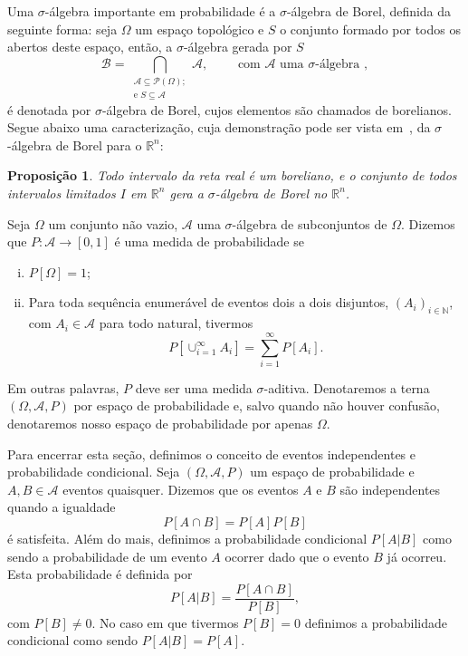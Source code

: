 \documentclass[twoside,openright,titlepage,numbers=noenddot,headinclude,  lineheaders footinclude=true,cleardoublepage=empty,
                                BCOR=5mm,paper=a4,fontsize=12pt ]{scrbook}
\newtheorem{prop}[teo]{Proposição}
\theoremstyle{definition}
\begin{document}
Uma $\sigma$-álgebra importante em probabilidade é a $\sigma$-álgebra de Borel, definida
da seguinte forma: seja $\Omega$ um espaço topológico e $S$ o conjunto formado
por todos os abertos deste espaço, então, a $\sigma$-álgebra  gerada por $S$
\[
\mathscr{B} = \bigcap_{ \substack{ \mathscr{A} \subseteq \mathscr{P}(\Omega);\\  
\text{e }S \subseteq \mathscr{A} } } \mathscr{A}, \qquad \text{ com } \mathscr{A} \text{ uma $\sigma$-álgebra },
\]
é denotada
por $\sigma$-álgebra de Borel, cujos elementos são chamados de borelianos. Segue abaixo uma caracterização,
cuja demonstração pode ser vista em~\cite{isnard},
da $\sigma$-álgebra de Borel para o $\mathbb{R}^n$:
\begin{prop}
Todo intervalo da reta real é um boreliano, e o conjunto de todos intervalos limitados $I$ em $\mathbb{R}^n$
gera a $\sigma$-álgebra de Borel no $\mathbb{R}^n$.
\end{prop}

Seja $\Omega$ um conjunto não vazio, $\mathscr{A}$ uma $\sigma$-álgebra de subconjuntos de $\Omega$.
Dizemos que $P: \mathscr{A} \rightarrow [0,1]$ é uma medida de probabilidade se
\begin{enumerate}[(i)]
\item $P[\Omega] = 1$;
\item Para toda sequência enumerável de eventos dois a dois disjuntos, $(A_i)_{i \in \mathbb{N}}$, com $A_i \in \mathscr{A}$ para todo 
natural, tivermos
\[
P[ \cup_{i = 1}^{\infty} A_i ] = \sum_{i=1}^{\infty} P[A_i].
\]
\end{enumerate}
Em outras palavras, $P$ deve ser uma medida $\sigma$-aditiva. Denotaremos a terna
$(\Omega, \mathscr{A}, P)$ por espaço de probabilidade e, salvo quando não houver confusão,
denotaremos nosso espaço de probabilidade por apenas $\Omega$.

Para encerrar esta seção, definimos o conceito de eventos independentes e probabilidade condicional.
Seja $(\Omega, \mathscr{A}, P)$ um espaço de probabilidade e $A, B \in \mathscr{A}$ eventos
quaisquer. Dizemos que os eventos $A$ e $B$ são independentes quando a igualdade
\[
P[A \cap B] = P[A] P[B]
\]
é satisfeita. Além do mais, definimos a probabilidade condicional $P[A|B]$ como sendo a probabilidade de um evento $A$ ocorrer dado 
que o evento $B$ já ocorreu. Esta probabilidade é definida por
\[
P[A | B] = \frac{ P[A \cap B] }{P[B]},
\]
com $P[B] \neq 0$. No caso em que tivermos $P[B] = 0$ definimos a probabilidade condicional
como sendo $P[A|B] = P[A]$.
\end{document}
